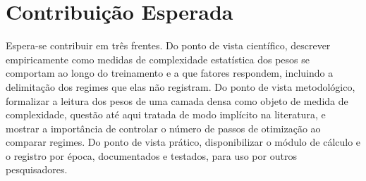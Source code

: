 \section{Contribuição Esperada}
\label{sec:P-contribuicao}

Espera-se contribuir em três frentes. Do ponto de vista científico, descrever
empiricamente como medidas de complexidade estatística dos pesos se comportam
ao longo do treinamento e a que fatores respondem, incluindo a delimitação dos
regimes que elas não registram. Do ponto de vista metodológico, formalizar a
leitura dos pesos de uma camada densa como objeto de medida de complexidade,
questão até aqui tratada de modo implícito na literatura, e mostrar a
importância de controlar o número de passos de otimização ao comparar regimes.
Do ponto de vista prático, disponibilizar o módulo de cálculo e o registro por
época, documentados e testados, para uso por outros pesquisadores.
